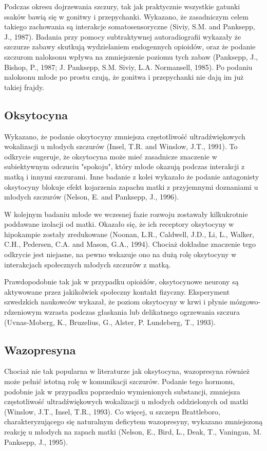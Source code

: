 \documentclass{psychol}
\begin{document}
Podczas okresu dojrzewania szczury, tak jak praktycznie wszystkie gatunki ssaków bawią się w gonitwy i przepychanki. Wykazano, że zasadniczym celem takiego zachowania są interakcje somatosensoryczne (Siviy, S.M. and Panksepp, J., 1987). Badania przy pomocy subtraktywnej autoradiografii wykazały że szczurze zabawy skutkują wydzielaniem endogennych opioidów, oraz że podanie szczurom naloksonu wpływa na zmniejszenie poziomu tych zabaw (Panksepp, J., Bishop, P., 1987; J. Panksepp, S.M. Siviy, L.A. Normansell, 1985).  Po podaniu naloksonu młode po prostu czują, że gonitwa i przepychanki nie dają im już takiej frajdy.

\subsection{Oksytocyna}

Wykazano, że podanie oksytocyny zmniejsza częstotliwość ultradźwiękowych wokalizacji u młodych szczurów (Insel, T.R. and Winslow, J.T., 1991). To odkrycie sugeruje, że oksytocyna może mieć zasadnicze znaczenie w subiektywnym odczuciu "spokoju", który młode okazują podczas interakcji z matką i innymi szczurami. Inne badanie z kolei wykazało że podanie antagonisty oksytocyny blokuje efekt kojarzenia zapachu matki z przyjemnymi doznaniami u młodych szczurów (Nelson, E. and Panksepp, J., 1996).

W kolejnym badaniu młode we wczesnej fazie rozwoju zostawały kilkukrotnie poddawane izolacji od matki. Okazało się, że ich receptory oksytocyny w hipokampie zostały zredukowane (Noonan, L.R., Caldwell, J.D., Li, L., Walker, C.H., Pedersen, C.A. and Mason, G.A., 1994). Chociaż dokładne znaczenie tego odkrycie jest niejasne, na pewno wskazuje ono na dużą rolę oksytocyny w interakcjach społecznych młodych szczurów z matką.

\pagebreak

Prawdopodobnie tak jak w przypadku opioidów, oksytocynowe neurony są aktywowane przez jakikolwiek społeczny kontakt fizyczny. Eksperyment szwedzkich naukowców wykazał, że poziom oksytocyny w krwi i płynie mózgowo-rdzeniowym wzrasta podczas głaskania lub delikatnego ogrzewania szczura (Uvnas-Moberg, K., Bruzelius, G., Alster, P. Lundeberg, T., 1993).

\subsection{Wazopresyna}

Chociaż nie tak popularna w literaturze jak oksytocyna, wazopresyna również może pełnić istotną rolę w komunikacji szczurów. Podanie tego hormonu, podobnie jak w przypadku poprzednio wymienionych substancji, zmniejsza częstotliwość ultradźwiękowych wokalizacji u młodych oddzielonych od matki (Winslow, J.T., Insel, T.R., 1993). Co więcej, u szczepu Brattleboro, charakteryzującego się naturalnym deficytem wazopresyny, wykazano zmniejszoną reakcję u młodych na zapach matki (Nelson, E., Bird, L., Deak, T., Vaningan, M. Panksepp, J., 1995).
\end{document}
